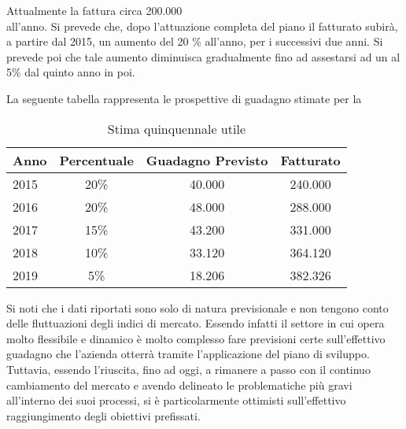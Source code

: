 Attualmente la \customer fattura circa 200.000 \text{\euro} \\ all'anno. Si prevede che, dopo l'attuazione completa del piano il fatturato subirà, a partire dal 2015, un aumento del 20 \% all'anno, per i successivi due anni. Si prevede poi che tale aumento diminuisca gradualmente fino ad assestarsi ad un al 5\% dal quinto anno in poi.
 
La seguente tabella rappresenta le prospettive di guadagno stimate per la \customer

\begin{table}[H]
\centering
\begin{tabular}{|p{}|c|c|c|}
\hline 

\textbf{ Anno} &  \textbf{Percentuale} &\textbf{Guadagno Previsto}& \textbf{Fatturato}\\
\hline
 2015 & 20\% & \text{\euro} 40.000 &\text{\euro} 240.000 \\
 2016 & 20\% & \text{\euro} 48.000 & \text{\euro} 288.000 \\
 2017 & 15\% & \text{\euro} 43.200 & \text{\euro} 331.000\\
 2018 & 10\% & \text{\euro} 33.120 & \text{\euro} 364.120\\
 2019 & 5\% & \text{\euro} 18.206 &  \text{\euro} 382.326\\
\hline

\end{tabular}
\caption{Stima quinquennale utile }\label{tab:utile}
\end{table}


Si noti che i dati riportati sono solo di natura previsionale e non tengono conto delle fluttuazioni degli indici di mercato. Essendo infatti il settore in cui opera \customer molto flessibile e dinamico è molto complesso fare previsioni certe sull'effettivo guadagno che l'azienda otterrà tramite l'applicazione del piano di sviluppo. Tuttavia, essendo l'\customer riuscita, fino ad oggi, a rimanere a passo con il continuo cambiamento del mercato e avendo delineato le problematiche più gravi all'interno dei suoi processi, si è particolarmente ottimisti sull'effettivo raggiungimento degli obiettivi prefissati.








